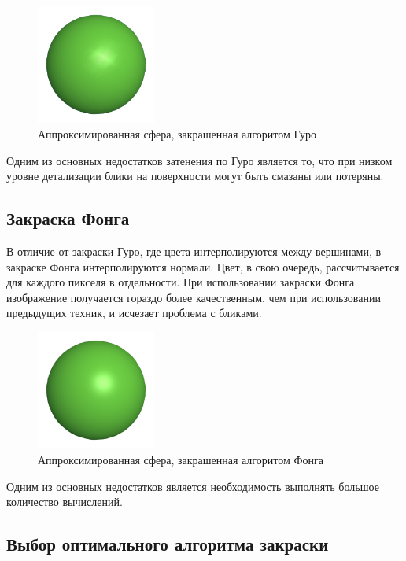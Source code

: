 \begin{figure}[h] 
	\centering
	\includegraphics[width=0.35\textwidth]{images/gurou-shading.png}
	\caption{Аппроксимированная сфера, закрашенная алгоритом Гуро} 
	\label{fig:gurou-shading} 
\end{figure}

Одним из основных недостатков затенения по Гуро является то, что при низком уровне детализации блики на поверхности могут быть смазаны или потеряны.

\subsection{Закраска Фонга}

В отличие от закраски Гуро, где цвета интерполируются между вершинами, в закраске Фонга интерполируются нормали. Цвет, в свою очередь, рассчитывается для каждого пикселя в отдельности. При использовании закраски Фонга изображение получается гораздо более качественным, чем при использовании предыдущих техник, и исчезает проблема с бликами.

\begin{figure}[h] 
	\centering
	\includegraphics[width=0.35\textwidth]{images/phong-shading.png}
	\caption{Аппроксимированная сфера, закрашенная алгоритом Фонга} 
	\label{fig:phong-shading} 
\end{figure}

Одним из основных недостатков является необходимость выполнять большое количество вычислений.

\subsection{Выбор оптимального алгоритма закраски}

